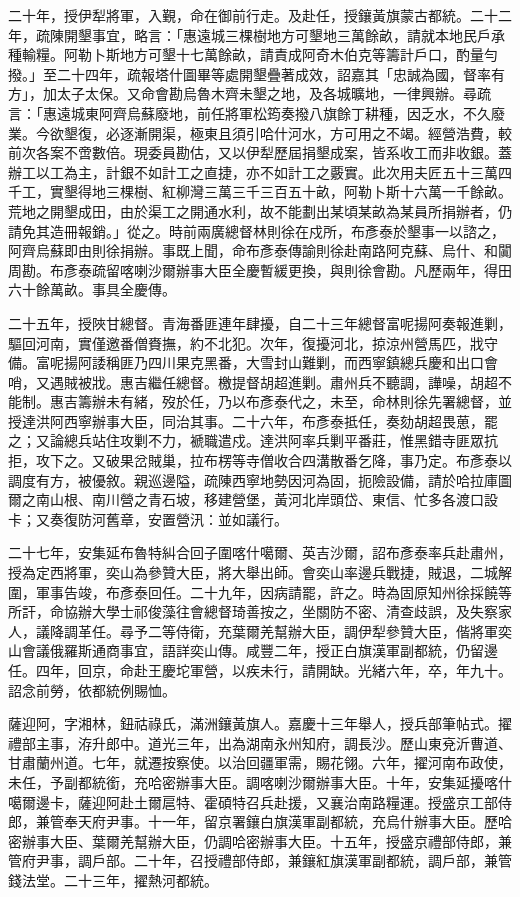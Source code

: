\begin{pinyinscope}
二十年，授伊犁將軍，入覲，命在御前行走。及赴任，授鑲黃旗蒙古都統。二十二年，疏陳開墾事宜，略言：「惠遠城三棵樹地方可墾地三萬餘畝，請就本地民戶承種輸糧。阿勒卜斯地方可墾十七萬餘畝，請責成阿奇木伯克等籌計戶口，酌量勻撥。」至二十四年，疏報塔什圖畢等處開墾疊著成效，詔嘉其「忠誠為國，督率有方」，加太子太保。又命會勘烏魯木齊未墾之地，及各城曠地，一律興辦。尋疏言：「惠遠城東阿齊烏蘇廢地，前任將軍松筠奏撥八旗餘丁耕種，因乏水，不久廢業。今欲墾復，必逐漸開渠，極東且須引哈什河水，方可用之不竭。經營浩費，較前次各案不啻數倍。現委員勘估，又以伊犁歷屆捐墾成案，皆系收工而非收銀。蓋辦工以工為主，計銀不如計工之直捷，亦不如計工之覈實。此次用夫匠五十三萬四千工，實墾得地三棵樹、紅柳灣三萬三千三百五十畝，阿勒卜斯十六萬一千餘畝。荒地之開墾成田，由於渠工之開通水利，故不能劃出某頃某畝為某員所捐辦者，仍請免其造冊報銷。」從之。時前兩廣總督林則徐在戍所，布彥泰於墾事一以諮之，阿齊烏蘇即由則徐捐辦。事既上聞，命布彥泰傳諭則徐赴南路阿克蘇、烏什、和闐周勘。布彥泰疏留喀喇沙爾辦事大臣全慶暫緩更換，與則徐會勘。凡歷兩年，得田六十餘萬畝。事具全慶傳。

二十五年，授陜甘總督。青海番匪連年肆擾，自二十三年總督富呢揚阿奏報進剿，驅回河南，實僅邀番僧賚撫，約不北犯。次年，復擾河北，掠涼州營馬匹，戕守備。富呢揚阿諉稱匪乃四川果克黑番，大雪封山難剿，而西寧鎮總兵慶和出口會哨，又遇賊被戕。惠吉繼任總督。檄提督胡超進剿。肅州兵不聽調，譁噪，胡超不能制。惠吉籌辦未有緒，歿於任，乃以布彥泰代之，未至，命林則徐先署總督，並授達洪阿西寧辦事大臣，同治其事。二十六年，布彥泰抵任，奏劾胡超畏葸，罷之；又論總兵站住攻剿不力，褫職遣戍。達洪阿率兵剿平番莊，惟黑錯寺匪眾抗拒，攻下之。又破果岔賊巢，拉布楞等寺僧收合四溝散番乞降，事乃定。布彥泰以調度有方，被優敘。親巡邊隘，疏陳西寧地勢因河為固，扼險設備，請於哈拉庫圖爾之南山根、南川營之青石坡，移建營堡，黃河北岸頭岱、東信、忙多各渡口設卡；又奏復防河舊章，安置營汛：並如議行。

二十七年，安集延布魯特糾合回子圍喀什噶爾、英吉沙爾，詔布彥泰率兵赴肅州，授為定西將軍，奕山為參贊大臣，將大舉出師。會奕山率邊兵戰捷，賊退，二城解圍，軍事告竣，布彥泰回任。二十九年，因病請罷，許之。時為固原知州徐採饒等所訐，命協辦大學士祁俊藻往會總督琦善按之，坐關防不密、清查歧誤，及失察家人，議降調革任。尋予二等侍衛，充葉爾羌幫辦大臣，調伊犁參贊大臣，偕將軍奕山會議俄羅斯通商事宜，語詳奕山傳。咸豐二年，授正白旗漢軍副都統，仍留邊任。四年，回京，命赴王慶坨軍營，以疾未行，請開缺。光緒六年，卒，年九十。詔念前勞，依都統例賜恤。

薩迎阿，字湘林，鈕祜祿氏，滿洲鑲黃旗人。嘉慶十三年舉人，授兵部筆帖式。擢禮部主事，洊升郎中。道光三年，出為湖南永州知府，調長沙。歷山東兗沂曹道、甘肅蘭州道。七年，就遷按察使。以治回疆軍需，賜花翎。六年，擢河南布政使，未任，予副都統銜，充哈密辦事大臣。調喀喇沙爾辦事大臣。十年，安集延擾喀什噶爾邊卡，薩迎阿赴土爾扈特、霍碩特召兵赴援，又襄治南路糧運。授盛京工部侍郎，兼管奉天府尹事。十一年，留京署鑲白旗漢軍副都統，充烏什辦事大臣。歷哈密辦事大臣、葉爾羌幫辦大臣，仍調哈密辦事大臣。十五年，授盛京禮部侍郎，兼管府尹事，調戶部。二十年，召授禮部侍郎，兼鑲紅旗漢軍副都統，調戶部，兼管錢法堂。二十三年，擢熱河都統。


\end{pinyinscope}
